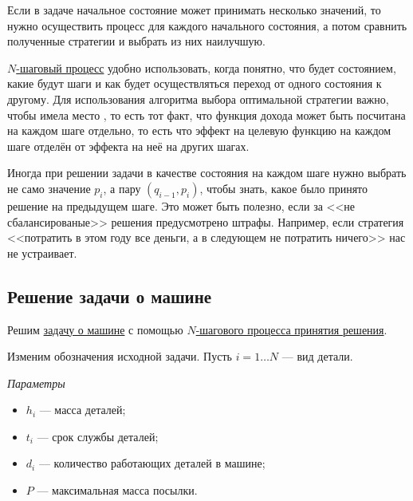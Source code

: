 Если в задаче начальное состояние может принимать несколько значений, то нужно осуществить процесс для каждого начального состояния, а потом сравнить полученные стратегии и выбрать из них наилучшую.

\remark

\hyperref[alg:n_step_process]{$N$-шаговый процесс} удобно использовать, когда понятно, что будет состоянием, какие будут шаги и как будет осуществляться переход от одного состояния к другому. Для использования алгоритма выбора оптимальной стратегии важно, чтобы имела место , то есть тот факт, что функция дохода может быть посчитана на каждом шаге отдельно, то есть что эффект на целевую функцию на каждом шаге отделён от эффекта на неё на других шагах.

\remark

Иногда при решении задачи в качестве состояния на каждом шаге нужно выбрать не само значение $p_i$, а пару $(q_{i-1}, p_i)$, чтобы знать, какое было принято решение на предыдущем шаге. Это может быть полезно, если за <<не сбалансированые>> решения предусмотрено штрафы. Например, если стратегия <<потратить в этом году все деньги, а в следующем не потратить ничего>> нас не устраивает.

\subsection{Решение задачи о машине}

Решим \hyperref[pr:car_on_island]{задачу о машине} с помощью \hyperref[alg:n_step_process]{$N$-шагового процесса принятия решения}.

\nstepprocess

Изменим обозначения исходной задачи. Пусть $i = 1 \dots N$ --- вид детали.

\bigskip

\textit{Параметры}

\begin{itemize}[nosep]
	\item $h_i$ --- масса деталей;
	
	\item $t_i$ --- срок службы деталей;
	
	\item $d_i$ --- количество работающих деталей в машине;
	
	\item $P$ --- максимальная масса посылки.
\end{itemize}

\bigskip

